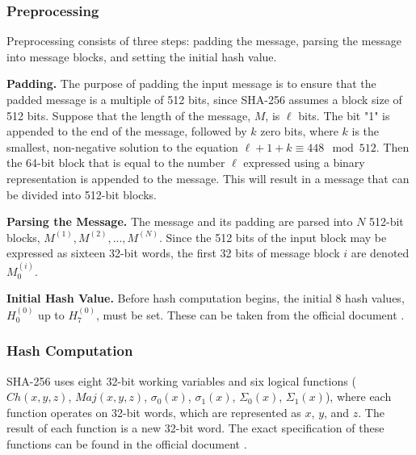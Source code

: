 \documentclass[letterpaper]{article}
\newcommand{\mypar}[1]{{\bf #1.}}
\begin{document}
\subsubsection{Preprocessing}
Preprocessing  consists  of  three  steps:  padding  the  message,  parsing  the  message into message blocks, and setting the initial hash value. 

\mypar{Padding} The  purpose of  padding  the input message is  to  ensure  that  the  padded  message  is  a  multiple  of  512 bits, since SHA-256 assumes a block size of 512 bits. Suppose  that  the  length  of  the  message, $M$,  is $\ell$ bits.  The bit "1" is appended to the end of the message, followed by $k$ zero bits, where $k$ is the smallest, non-negative solution to the equation $\ell +1+k \equiv 448 \mod 512$.  Then  the  64-bit  block  that  is  equal  to  the  number $\ell$ expressed using  a  binary  representation is appended to the message. This will result in a message that can be divided into 512-bit blocks.

\mypar{Parsing the Message} The  message  and  its  padding  are  parsed  into $N$ 512-bit blocks, $M^{(1)}, M^{(2)},..., M^{(N)}$.  Since the 512 bits of the input block may be expressed as sixteen 32-bit words, the first 32 bits of message block $i$ are denoted $M^{(i)}_0$.

\mypar{Initial Hash Value}
Before  hash  computation  begins,  the  initial 8  hash  values, $H^{(0)}_0$ up to $H^{(0)}_7$, must be set. These can be taken from the official document \cite{sha}.

\subsubsection{Hash Computation}\label{sha256-comp}
SHA-256 uses eight  32-bit working variables and  six  logical  functions ($Ch(x,y,z)$,  $Maj(x,y,z)$, $\sigma_0(x)$, $\sigma_1(x)$, $\Sigma_0(x)$, $\Sigma_1(x)$),  where each  function  operates  on  32-bit words, which are represented as $x$, $y$, and $z$. The result of each function is a new 32-bit word. The exact specification of these functions can be found in the official document \cite{sha}. 
\end{document}
